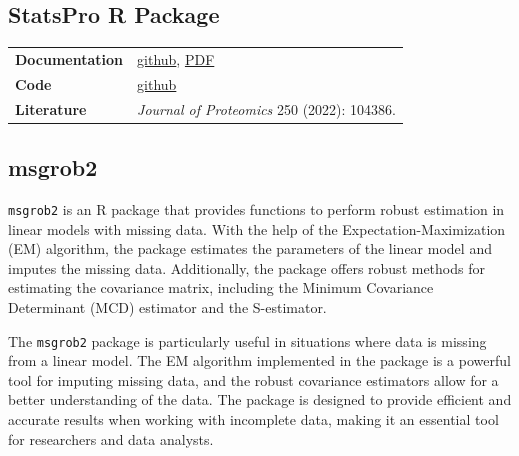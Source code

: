 \documentclass[
]{book}
\begin{document}
\hypertarget{statspro-r-package}{%
\subsection*{StatsPro R Package}\label{statspro-r-package}}

\begin{longtable}[]{@{}
  >{\raggedright\arraybackslash}p{}
  >{\raggedright\arraybackslash}p{}@{}}
\toprule\noalign{}
\endhead
\bottomrule\noalign{}
\endlastfoot
\textbf{Documentation} & \href{https://github.com/YanglabWCH/StatsPro\#Readme}{github}, \href{https://github.com/YanglabWCH/StatsPro/blob/main/StatsPro_Manual.pdf}{PDF} \\
\textbf{Code} & \href{https://github.com/YanglabWCH/StatsPro}{github} \\
\textbf{Literature} & \emph{Journal of Proteomics} 250 (2022): 104386. \\
\end{longtable}

\hypertarget{msgrob2}{%
\subsection*{msgrob2}\label{msgrob2}}

\texttt{msgrob2} is an R package that provides functions to perform robust estimation in linear models with missing data. With the help of the Expectation-Maximization (EM) algorithm, the package estimates the parameters of the linear model and imputes the missing data. Additionally, the package offers robust methods for estimating the covariance matrix, including the Minimum Covariance Determinant (MCD) estimator and the S-estimator.

The \texttt{msgrob2} package is particularly useful in situations where data is missing from a linear model. The EM algorithm implemented in the package is a powerful tool for imputing missing data, and the robust covariance estimators allow for a better understanding of the data. The package is designed to provide efficient and accurate results when working with incomplete data, making it an essential tool for researchers and data analysts.
\end{document}
